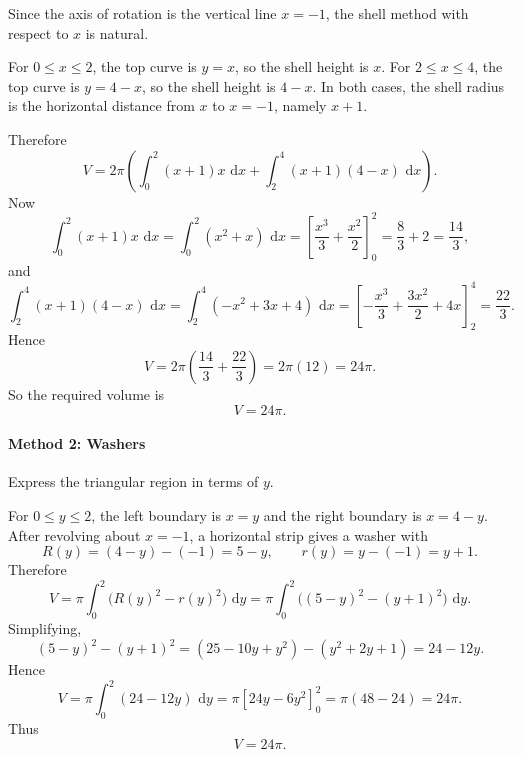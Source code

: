 \documentclass[12pt]{article}
\newcommand{\dd}{\,\mathrm{d}}
\begin{document}
\begin{center}
\end{center}
Since the axis of rotation is the vertical line \(x=-1\), the shell method with respect to \(x\) is natural.

For \(0\le x\le 2\), the top curve is \(y=x\), so the shell height is \(x\).
For \(2\le x\le 4\), the top curve is \(y=4-x\), so the shell height is \(4-x\).
In both cases, the shell radius is the horizontal distance from \(x\) to \(x=-1\), namely \(x+1\).

Therefore
\[
V=2\pi\left(\int_0^2 (x+1)x\,\dd x+\int_2^4 (x+1)(4-x)\,\dd x\right).
\]
Now
\[
\int_0^2 (x+1)x\,\dd x
=\int_0^2 (x^2+x)\,\dd x
=\left[\frac{x^3}{3}+\frac{x^2}{2}\right]_0^2
=\frac{8}{3}+2
=\frac{14}{3},
\]
and
\[
\int_2^4 (x+1)(4-x)\,\dd x
=\int_2^4 (-x^2+3x+4)\,\dd x
=\left[-\frac{x^3}{3}+\frac{3x^2}{2}+4x\right]_2^4
=\frac{22}{3}.
\]
Hence
\[
V=2\pi\left(\frac{14}{3}+\frac{22}{3}\right)=2\pi(12)=24\pi.
\]
So the required volume is
\[
\boxed{V=24\pi.}
\]
\newpage
\paragraph{Method 2: Washers}
Express the triangular region in terms of \(y\).



For \(0\le y\le 2\), the left boundary is \(x=y\) and the right boundary is \(x=4-y\).
After revolving about \(x=-1\), a horizontal strip gives a washer with
\[
R(y)=(4-y)-(-1)=5-y,
\qquad
r(y)=y-(-1)=y+1.
\]
Therefore
\[
V=\pi\int_0^2 \bigl(R(y)^2-r(y)^2\bigr)\,\dd y
=\pi\int_0^2 \bigl((5-y)^2-(y+1)^2\bigr)\,\dd y.
\]
Simplifying,
\[
(5-y)^2-(y+1)^2
=(25-10y+y^2)-(y^2+2y+1)
=24-12y.
\]
Hence
\[
V=\pi\int_0^2 (24-12y)\,\dd y
=\pi\left[24y-6y^2\right]_0^2
=\pi(48-24)
=24\pi.
\]
Thus
\[
\boxed{V=24\pi.}
\]
\end{document}

